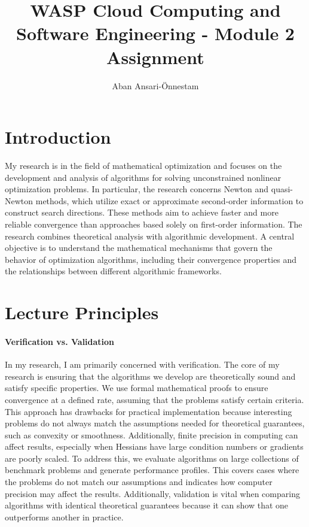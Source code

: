 \documentclass[12pt]{article}
\title{\vspace{-1.5cm}WASP Cloud Computing and Software Engineering - Module 2 Assignment}
\author{Aban Ansari-Önnestam}
\date{}
\begin{document}
\maketitle
\section{Introduction}
My research is in the field of mathematical optimization and focuses on the development and analysis of algorithms for solving unconstrained nonlinear optimization problems. In particular, the research concerns Newton and quasi-Newton methods, which utilize exact or approximate second-order information to construct search directions. These methods aim to achieve faster and more reliable convergence than approaches based solely on first-order information.
The research combines theoretical analysis with algorithmic development. A central objective is to understand the mathematical mechanisms that govern the behavior of optimization algorithms, including their convergence properties and the relationships between different algorithmic frameworks.
\section{Lecture Principles}
\paragraph{Verification vs. Validation} In my research, I am primarily concerned with verification. The core of my research is ensuring that the algorithms we develop are theoretically sound and satisfy specific properties. We use formal mathematical proofs to ensure convergence at a defined rate, assuming that the problems satisfy certain criteria.
This approach has drawbacks for practical implementation because interesting problems do not always match the assumptions needed for theoretical guarantees, such as convexity or smoothness. Additionally, finite precision in computing can affect results, especially when Hessians have large condition numbers or gradients are poorly scaled.
To address this, we evaluate algorithms on large collections of benchmark problems and generate performance profiles. This covers cases where the problems do not match our assumptions and indicates how computer precision may affect the results. Additionally, validation is vital when comparing algorithms with identical theoretical guarantees because it can show that one outperforms another in practice.
\end{document}
